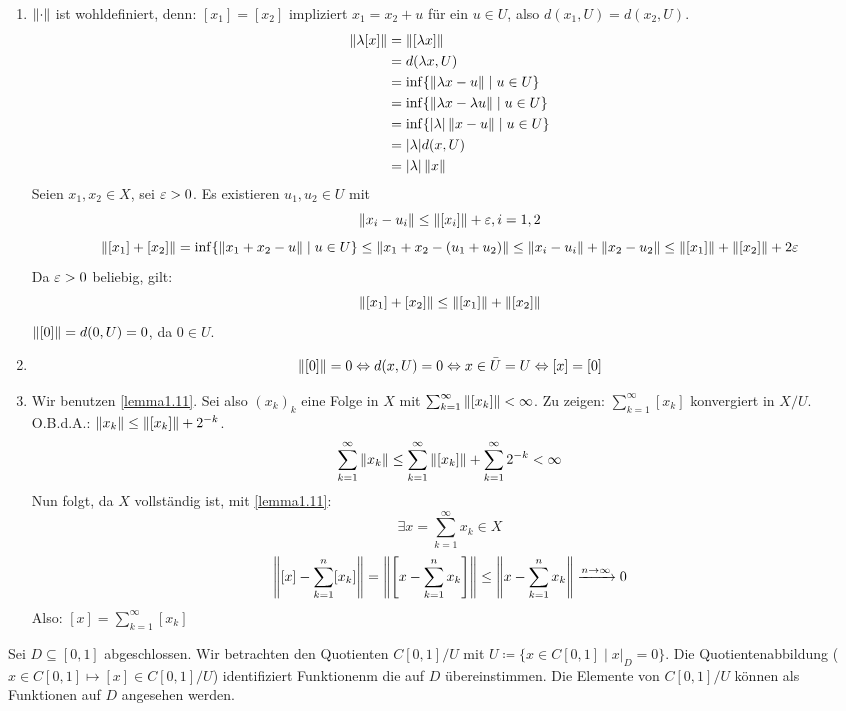 \begin{beweis}
	\begin{enumerate}
		\item $ \left\|\cdot\right\| $ ist wohldefiniert, denn: $ [x_1]=[x_2] $ impliziert $ x_1=x_2+u $ f\"ur ein $ u\in U $, also $ d(x_1,U)=d(x_2,U) $.
		\begin{align*} \left\|\lambda[x]\right\|&=\left\|[\lambda x]\right\|\\&=d(\lambda x, U)\\&=\inf\lbrace \left\|\lambda x-u\right\|\mid u\in U\rbrace\\&=\inf\lbrace\left\|\lambda x-\lambda u\right\|\mid u\in U\rbrace\\&=\inf\lbrace|\lambda|\left\|x-u\right\|\mid u\in U\rbrace\\&=|\lambda|d(x,U)\\&=|\lambda|\left\|x\right\| \end{align*}
		Seien $ x_1,x_2\in X $, sei $ \varepsilon>0 $. Es existieren $ u_1,u_2\in U $ mit \[ \left\|x_i-u_i\right\|\leq\left\|[x_i]\right\|+\varepsilon, i=1,2 \]
		\[ \left\|[x_1]+[x_2]\right\|=\inf\lbrace\left\|x_1+x_2-u\right\|\mid u\in U\rbrace\leq\left\|x_1+x_2-(u_1+u_2)\right\|\leq\left\|x_i-u_i\right\|+\left\|x_2-u_2\right\|\leq\left\|[x_1]\right\|+\left\|[x_2]\right\|+2\varepsilon \]
		Da $ \varepsilon>0 $ beliebig, gilt:
		\[ \left\|[x_1]+[x_2]\right\|\leq\left\|[x_1]\right\|+\left\|[x_2]\right\| \]
		$ \left\|[0]\right\|=d(0,U)=0 $, da $ 0\in U $.
		\item \[ \left\|[0]\right\|=0\Leftrightarrow d(x,U)=0\Leftrightarrow x\in\bar U=U\Leftrightarrow[x]=[0] \]
		\item Wir benutzen \ref{lemma1.11}. Sei also $ (x_k)_k $ eine Folge in $ X $ mit $ \sum_{k=1}^{\infty}\left\|[x_k]\right\|<\infty $. Zu zeigen: $ \sum_{k=1}^{\infty}[x_k] $ konvergiert in $ X/U $.\\
		O.B.d.A.: $ \left\|x_k\right\|\leq\left\|[x_k]\right\|+2^{-k} $.
		\[ \sum_{k=1}^{\infty}\left\|x_k\right\|\leq\sum_{k=1}^{\infty}\left\|[x_k]\right\|+\sum_{k=1}^{\infty}2^{-k}<\infty \]
		Nun folgt, da $ X $ vollst\"andig ist, mit \ref{lemma1.11}:
		\[ \exists x=\sum_{k=1}^{\infty}x_k\in X \]
		\[ \left\|[x]-\sum_{k=1}^{n}[x_k]\right\|=\left\|\left[x-\sum_{k=1}^{n}x_k\right]\right\|\leq\left\|x-\sum_{k=1}^{n}x_k\right\|\xrightarrow{n\to\infty}0 \]
		Also: $ [x]=\sum_{k=1}^{\infty}[x_k] $
	\end{enumerate}
\end{beweis}
\begin{beispiel*}
	Sei $ D\subseteq[0,1] $ abgeschlossen. Wir betrachten den Quotienten $ C[0,1]/U $ mit $ U\coloneqq\lbrace x\in C[0,1]\mid x|_D=0\rbrace $. Die Quotientenabbildung ($ x\in C[0,1]\mapsto[x]\in C[0,1]/U $) identifiziert Funktionenm die auf $ D $ \"ubereinstimmen. Die Elemente von $ C[0,1]/U $ k\"onnen als Funktionen auf $ D $ angesehen werden.
\end{beispiel*}